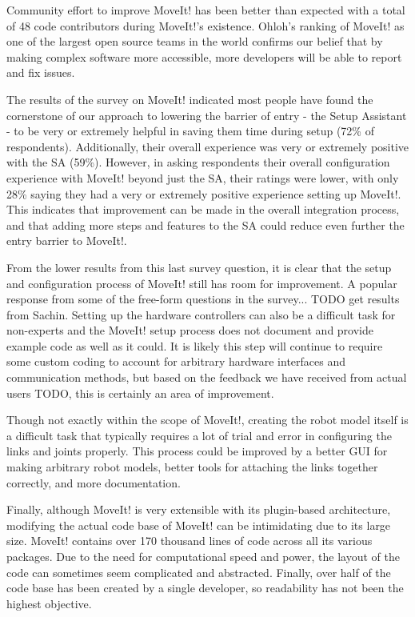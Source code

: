 \documentclass[10pt,journal,compsoc]{joser1}
\begin{document}
{Community effort to improve MoveIt! has been better than expected with a total of 48 code contributors during MoveIt!'s existence. Ohloh's ranking of MoveIt! as one of the largest open source teams in the world confirms our belief that by making complex software more accessible, more developers will be able to report and fix issues. 

The results of the survey on MoveIt! indicated most people have found the cornerstone of our approach to lowering the barrier of entry - the Setup Assistant - to be very or extremely helpful in saving them time during setup (72\% of respondents). Additionally, their overall experience was very or extremely positive with the SA (59\%). However, in asking respondents their overall configuration experience with MoveIt! beyond just the SA, their ratings were lower, with only 28\% saying they had a very or extremely positive experience setting up MoveIt!. This indicates that improvement can be made in the overall integration process, and that adding more steps and features to the SA could reduce even further the entry barrier to MoveIt!. 

From the lower results from this last survey question, it is clear that the setup and configuration process of MoveIt! still has room for improvement. A popular response from some of the free-form questions in the survey... TODO get results from Sachin. Setting up the hardware controllers can also be a difficult task for non-experts and the MoveIt! setup process does not document and provide example code as well as it could. It is likely this step will continue to require some custom coding to account for arbitrary hardware interfaces and communication methods, but based on the feedback we have received from actual users TODO, this is certainly an area of improvement. 

Though not exactly within the scope of MoveIt!, creating the robot model itself is a difficult task that typically requires a lot of trial and error in configuring the links and joints properly. This process could be improved by a better GUI for making arbitrary robot models, better tools for attaching the links together correctly, and more documentation.

Finally, although MoveIt! is very extensible with its plugin-based architecture, modifying the actual code base of MoveIt! can be intimidating due to its large size. MoveIt! contains over 170 thousand lines of code across all its various packages. Due to the need for computational speed and power, the layout of the code can sometimes seem complicated and abstracted. Finally, over half of the code base has been created by a single developer, so readability has not been the highest objective. 

}
\end{document}
